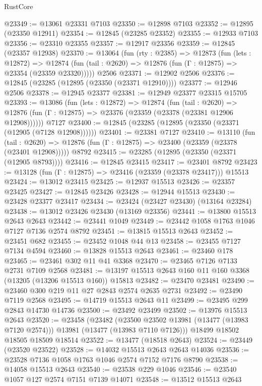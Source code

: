 \begin{lexlean}{RustCore}
\begin{coremodule}
@23349 := @13061 @23331 @7103
@23350 := @12898 @7103
@23352 := @12895 (@23350 @12911)
@23354 := @12845 (@23285 @23352)
@23355 := @12933 @7103
@23356 := @23310 @23355
@23357 := @12917 @23356
@23359 := @12845 (@23357 @12938)
@23370 := @13064
    (fun (rty : @2385) =>
    @12873
      (fun (lets : @12872) =>
      @12874 (fun (tail : @2620) => @12876 (fun (Γ : @12875) => @23354 (@23359 @23320)))))
    @2506
@23371 := @12902 @2506
@23376 := @12845 (@23285 (@12895 (@23350 (@23371 @12910))))
@23377 := @12946 @2506
@23378 := @12945 @23377
@23381 := @12949 @23377 @23315 @15705
@23393 := @13086
    (fun (lets : @12872) =>
    @12874
      (fun (tail : @2620) =>
      @12876 (fun (Γ : @12875) => @23376 (@23359 (@23378 (@23381 @12906 @12908))))))
    @7127
@23400 := @12845 (@23285 (@12895 (@23350 (@23371 (@12905 (@7128 @12908))))))
@23401 := @23381 @7127
@23410 := @13110
    (fun (tail : @2620) => @12876 (fun (Γ : @12875) => @23400 (@23359 (@23378 (@23401 @12908)))))
    @8792
@23415 := @23285 (@12895 (@23350 (@23371 (@12905 @8793))))
@23416 := @12845 @23415
@23417 := @23401 @8792
@23423 := @13128 (fun (Γ : @12875) => @23416 (@23359 (@23378 @23417))) @15513
@23424 := @13012 @23415
@23425 := @12937 @15513
@23426 := @23357 @23425
@23427 := @12845 @23426
@23428 := @12944 @15513
@23430 := @23428 @23377 @23417
@23434 := @23424 (@23427 @23430) (@13164 @23284)
@23438 := @13012 @23426 @23430 (@13169 @23356)
@23441 := @13800 @15513 @2643 @2643
@23442 := @23441 @1049
@23449 := @23442 @1058 @1763 @1046 @7127 @7136 @2574 @8792
@23451 := @13815 @15513 @2643
@23452 := @23451 @682
@23455 := @23452 @1048 @44 @13
@23458 := @23455 @7127 @7134 @4594
@23460 := @13828 @15513 @2643
@23461 := @23460 @178
@23465 := @23461 @302 @11 @41 @3368
@23470 := @23465 @7126 @7133 @2731 @7109 @2568
@23481 := @13197 @15513 @2643 @160 @11 @160 @3368 (@13205 (@13206 @15513 @160)) @15813
@23482 := @23470 @23481
@23490 := @23460 @300 @219 @11 @27 @2843 @2574 @2635 @2731
@23492 := @23490 @7119 @2568
@23495 := @14719 @15513 @2643 @11
@23499 := @23495 @299 @2843 @14730 @14736
@23500 := @23492 @23499
@23502 := @13976 @15513 @2643
@23520 := @23458
    (@23482
      (@23500 @23502 @13981 (@13477 (@13983 @7120 @2574)))
      @13981
      (@13477 (@13983 @7110 @7126)))
    @18499
    @18502
    @18505
    @18509
    @18514
@23522 := @13477 (@18518 @2643)
@23524 := @23449 (@23520 @23522)
@23528 := @14032 @15513 @2643 @2643 @14036
@23536 := @23528 @7136 @1058 @1763 @1046 @2574 @7152 @7176 @8790
@23538 := @14058 @15513 @2643
@23540 := @23538 @229 @1046
@23546 := @23540 @1057 @127 @2574 @7151 @7139 @14071
@23548 := @13512 @15513 @2643

\end{coremodule}
\end{lexlean}
